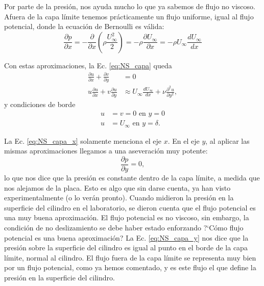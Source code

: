 Por parte de la presión, nos ayuda mucho lo que ya sabemos de flujo no viscoso. 
Afuera de la capa límite tenemos prácticamente un flujo uniforme, igual al flujo potencial, donde la ecuación de Bernoulli es válida:
%
\begin{equation}
\frac{\partial p}{\partial x} = -\frac{\partial}{\partial x}\left(\rho \frac{U_\infty^2}{2}\right) = - \rho\frac{\partial U_\infty}{\partial x} = -\rho U_\infty\frac{dU_\infty}{dx} 
\end{equation}

Con estas aproximaciones, la Ec. \eqref{eq:NS_capa} queda
%
\begin{align}\label{eq:NS_capa_x}
\frac{\partial u}{\partial x} + \frac{\partial v}{\partial y} &= 0 \nonumber\\
u\frac{\partial u}{\partial x} + v\frac{\partial u}{\partial y} &\approx U_\infty \frac{dU_\infty}{dx} + \nu \frac{\partial^2u}{\partial y^2},
\end{align}
%
y condiciones de borde
%
\begin{align}
u &= v = 0 \text{ en } y=0\nonumber\\
u &= U_\infty \text{ en } y=\delta.
\end{align}

La Ec. \eqref{eq:NS_capa_x} solamente menciona el eje $x$.
En el eje $y$, al aplicar las mismas aproximaciones llegamos a una aseveración muy potente:
%
\begin{equation}\label{eq:NS_capa_y}
\frac{\partial p}{\partial y} = 0,
\end{equation}
%
lo que nos dice que la presión es constante dentro de la capa límite, a medida que nos alejamos de la placa.
Esto es algo que sin darse cuenta, ya han visto experimentalmente (o lo verán pronto).
Cuando midieron la presión en la superficie del cilindro en el laboratorio, se dieron cuenta que el flujo potencial es una muy buena aproximación.
El flujo potencial es no viscoso, sin embargo, la condición de no deslizamiento se debe haber estado enforzando \mbox{?`}Cómo flujo potencial es una buena aproximación?
La Ec. \eqref{eq:NS_capa_y} nos dice que la presión sobre la superficie del cilindro es igual al punto en el borde de la capa límite, normal al cilindro. 
El flujo fuera de la capa límite se representa muy bien por un flujo potencial, como ya hemos comentado, y es este flujo el que define la presión en la superficie del cilindro.

